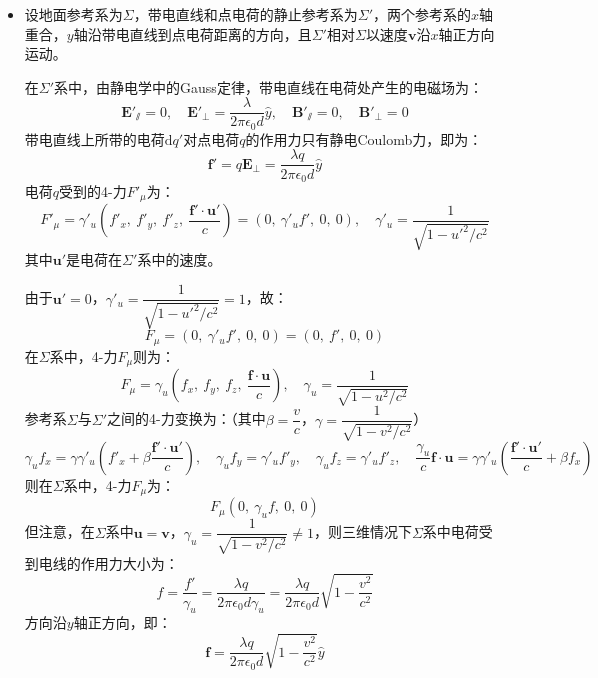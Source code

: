 \documentclass[a4paper,fontset=none]{ctexart}
\begin{document}
\begin{itemize}
    \item[16.(a)]
    设地面参考系为$\varSigma$，带电直线和点电荷的静止参考系为$\varSigma'$，两个参考系的$x$轴重合，$y$轴沿带电直线到点电荷距离的方向，且$\varSigma'$相对$\varSigma$以速度$\bm{v}$沿$x$轴正方向运动。

    在$\varSigma'$系中，由静电学中的Gauss定律，带电直线在电荷处产生的电磁场为：
    \[
        \bm{E}'_\varparallel = 0,\quad
        \bm{E}'_\perp = \frac{\lambda}{2\pi\epsilon_0d}\hat{y},\quad
        \bm{B}'_\varparallel = 0,\quad
        \bm{B}'_\perp = 0
    \]
    带电直线上所带的电荷$\mathrm{d}q'$对点电荷$q$的作用力只有静电Coulomb力，即为：
    \[
        \bm{f}' = q\bm{E}_\perp = \frac{\lambda q}{2\pi\epsilon_0d}\hat{y}
    \]
    电荷$q$受到的4-力$F'_\mu$为：
    \[
        F'_\mu = \gamma'_u\left(f'_x,\ f'_y,\ f'_z,\ \frac{\bm{f}'\cdot\bm{u}'}{c}\right) = (0,\ \gamma'_u f',\ 0,\ 0),\quad \gamma'_u = \frac{1}{\sqrt{1-{u'}^2/c^2}}
    \]
    其中$\bm{u}'$是电荷在$\varSigma'$系中的速度。

    由于$\bm{u}'=0$，$\gamma'_u=\dfrac{1}{\sqrt{1-{u'}^2/c^2}}=1$，故：
    \[
        F_\mu = (0,\ \gamma'_u f',\ 0,\ 0) = (0,\ f',\ 0,\ 0)
    \]
    在$\varSigma$系中，4-力$F_\mu$则为：
    \[
        F_\mu = \gamma_u\left(f_x,\ f_y,\ f_z,\ \frac{\bm{f}\cdot\bm{u}}{c}\right),\quad \gamma_u = \frac{1}{\sqrt{1-u^2/c^2}}
    \]
    参考系$\varSigma$与$\varSigma'$之间的4-力变换为：（其中$\beta=\dfrac{v}{c}$，$\gamma=\dfrac{1}{\sqrt{1-v^2/c^2}}$）
    \[
        \gamma_u f_x = \gamma\gamma'_u\left(f'_x + \beta\frac{\bm{f}'\cdot\bm{u}'}{c}\right),\quad
        \gamma_u f_y = \gamma'_u f'_y,\quad
        \gamma_u f_z = \gamma'_u f'_z,\quad
        \frac{\gamma_u}{c}\bm{f}\cdot\bm{u} = \gamma\gamma'_u\left(\frac{\bm{f}'\cdot\bm{u}'}{c} + \beta f_x\right)
    \]
    则在$\varSigma$系中，4-力$F_\mu$为：
    \[
        F_\mu(0,\ \gamma_u f,\ 0,\ 0)
    \]
    但注意，在$\varSigma$系中$\bm{u}=\bm{v}$，$\gamma_u=\dfrac{1}{\sqrt{1-v^2/c^2}}\neq1$，则三维情况下$\varSigma$系中电荷受到电线的作用力大小为：
    \[
        f = \frac{f'}{\gamma_u} = \frac{\lambda q}{2\pi\epsilon_0d\gamma_u} = \frac{\lambda q}{2\pi\epsilon_0d}\sqrt{1 - \frac{v^2}{c^2}}
    \]
    方向沿$y$轴正方向，即：
    \[
        \bm{f} = \frac{\lambda q}{2\pi\epsilon_0d}\sqrt{1 - \frac{v^2}{c^2}}\hat{y}
    \]


\end{itemize}
\end{document}
